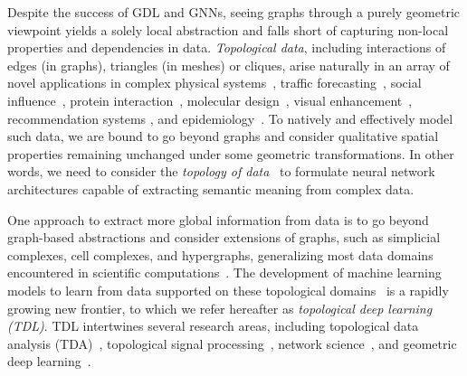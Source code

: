 Despite the success of GDL and GNNs, seeing graphs through a purely geometric viewpoint yields a solely local abstraction and falls short of capturing non-local properties and dependencies in data. \emph{Topological data}, including interactions of edges (in graphs), triangles (in meshes) or cliques, arise naturally in an array of novel applications in complex physical systems~\cite{battiston2021physics,lambiotte2019networks}, traffic forecasting~\cite{jiang2022graph}, social influence~\cite{zhu2018social}, protein interaction~\cite{murgas2022hypergraph}, molecular design~\cite{schiff2020characterizing}, visual enhancement~\cite{efthymiou2021graph}, recommendation systems \cite{la2022music}, and epidemiology~\cite{deng2020cola}.
To natively and effectively model such data, we are bound to go beyond graphs and consider qualitative spatial properties remaining unchanged under some geometric transformations. In other words, we need to consider the \emph{topology of data}~\cite{carlsson2009topology} to formulate neural network architectures capable of extracting semantic meaning from complex data.


One approach to extract more global information from data is to go beyond graph-based abstractions and consider extensions of graphs, such as simplicial complexes, cell complexes, and hypergraphs, generalizing most data domains encountered in scientific computations~\cite{bick2021higher,battiston2020networks,benson2021higher,torres2021and}.
The development of machine learning models to learn from data supported on these topological domains~\cite{feng2019hypergraph,bunch2020simplicial, roddenberry2021signal,schaub2020random,billings2019simplex2vec,hacker2020k,hajijcell,ebli2020simplicial,schaub2021signal,roddenberry2021principled,giusti2022cell,yang2023convolutional} is a rapidly growing new frontier, to which we refer hereafter as \emph{topological deep learning (TDL)}.
TDL intertwines several research areas, including topological data analysis (TDA)~\cite{edelsbrunner2010computational,carlsson2009topology,DW22,love2020topological,ghrist2014elementary}, topological signal processing~\cite{schaub2018denoising,yang2021finite,schaub2022signal,roddenberry2021signal,barbarossa2020topological,robinson2014topological,sardellitti2022topological}, network science~\cite{skardal2021higher,lambiotte2019networks,barabasi2013network,battiston2020networks,bick2021higher,bianconi2021higher,benson2016higher,de2016physics,bao2022impact,oballe2021bayesian}, and geometric deep learning~\cite{zhang2020deep,cao2020comprehensive,fey2019fast,loukas2019graph,battaglia2018relational,morris2019weisfeiler,battaglia2016interaction}.

